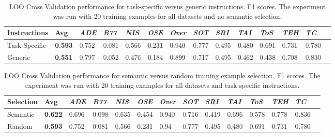 \documentclass{article}
\begin{document}
\begin{itemize}
\begin{table}[ht]
\centering
\begin{tabular}{m{6em} M{1.5em} M{1.5em} M{1.5em} M{1.5em} M{1.5em} M{1.5em} M{1.5em} M{1.5em} M{1.5em} M{1.5em} M{1.5em} M{1.5em} M{1.5em}}
\toprule
\textbf{Instructions} & \textbf{Avg} & \textit{ADE} & \textit{B77} & \textit{NIS} & \textit{OSE} & \textit{Over} & \textit{SOT} & \textit{SRI} & \textit{TAI} & \textit{ToS} & \textit{TEH} & \textit{TC} \\  
\midrule
Task-Specific & \textbf{0.593} & 0.752 & 0.081 & 0.566 & 0.231 & 0.940 & 0.777 & 0.495 & 0.480 & 0.691 & 0.731 & 0.780 \\
Generic & \textbf{0.551} & 0.797 & 0.052 & 0.476 & 0.184 & 0.899 & 0.717 & 0.495 & 0.462 & 0.438 & 0.708 & 0.830 \\
\bottomrule
\end{tabular}
\caption{LOO Cross Validation performance for task-specific versus generic instructions, F1 scores. The experiment was run with 20 training examples for all datasets and no semantic selection.}
\label{tab:instruction-results}
\end{table}

\begin{table}[ht]
\centering
\begin{tabular}{m{6em} M{1.5em} M{1.5em} M{1.5em} M{1.5em} M{1.5em} M{1.5em} M{1.5em} M{1.5em} M{1.5em} M{1.5em} M{1.5em} M{1.5em} M{1.5em}}
\toprule
\textbf{Selection} & \textbf{Avg} & \textit{ADE} & \textit{B77} & \textit{NIS} & \textit{OSE} & \textit{Over} & \textit{SOT} & \textit{SRI} & \textit{TAI} & \textit{ToS} & \textit{TEH} & \textit{TC} \\  
\midrule
Semantic & \textbf{0.622} & 0.696 & 0.098 & 0.635 & 0.454 & 0.940 & 0.716 & 0.419 & 0.696 & 0.578 & 0.778 & 0.836 \\
Random & \textbf{0.593} & 0.752 & 0.081 & 0.566 & 0.231 & 0.94 & 0.777 & 0.495 & 0.480 & 0.691 & 0.731 & 0.780 \\
\bottomrule
\end{tabular}
\caption{LOO Cross Validation performance for semantic versus random training example selection, F1 scores. The experiment was run with 20 training examples for all datasets and task-specific instructions.}
\label{tab:semantic-results}
\end{table}


\end{itemize}
\end{document}
